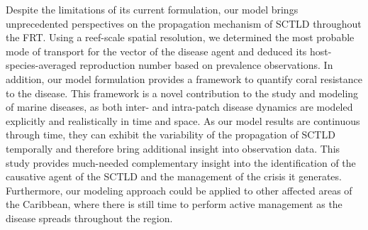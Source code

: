 Despite the limitations of its current formulation, our model brings unprecedented perspectives on the propagation mechanism of SCTLD throughout the FRT. Using a reef-scale spatial resolution, we determined the most probable mode of transport for the vector of the disease agent and deduced its host-species-averaged reproduction number based on prevalence observations. In addition, our model formulation provides a framework to quantify coral resistance to the disease.  This framework is a novel contribution to the study and modeling of marine diseases, as both inter- and intra-patch disease dynamics are modeled explicitly and realistically in time and space. As our model results are continuous through time, they can exhibit the variability of the propagation of SCTLD temporally and therefore bring additional insight into observation data. This study provides much-needed complementary insight into the identification of the causative agent of the SCTLD and the management of the crisis it generates. Furthermore, our modeling approach could be applied to other affected areas of the Caribbean, where there is still time to perform active management as the disease spreads throughout the region.

% 



  
